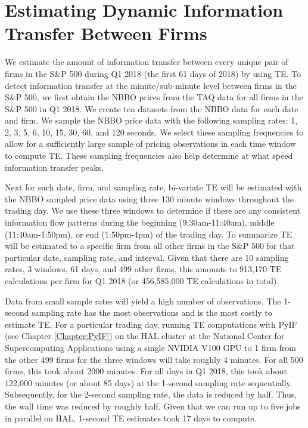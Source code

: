 \section{Estimating Dynamic Information Transfer Between Firms}

We estimate the amount of information transfer between every unique pair of firms in the S\&P 500 during Q1 2018 (the first 61 days of 2018) by using TE.  To detect information transfer at the minute/sub-minute level between firms in the S\&P 500, we first obtain the NBBO prices from the TAQ data for all firms in the S\&P 500 in Q1 2018.  We create ten datasets from the NBBO data for each date and firm.  We sample the NBBO price data with the following sampling rates: 1,  2,  3,  5,  6,  10,  15,  30,  60,  and 120 seconds. We select these sampling frequencies to allow for a sufficiently large sample of pricing observations in each time window to compute TE.  These sampling frequencies also help determine at what speed information transfer peaks.  

Next for each date,  firm, and sampling rate,  bi-variate TE will be estimated with the NBBO sampled price data using three 130 minute windows throughout the trading day. We use these three windows to determine if there are any consistent information flow patterns during the beginning (9:30am-11:40am), middle (11:40am-1:50pm), or end (1:50pm-4pm) of the trading day.  To summarize TE will be estimated to a specific firm from all other firms in the S\&P 500 for that particular date,  sampling rate,  and interval.  Given that there are 10 sampling rates,  3 windows,  61 days,  and 499 other firms, this amounts to 913,170 TE calculations per firm for Q1 2018 (or 456,585,000 TE calculations in total).  

Data from small sample rates will yield a high number of observations.  %
The 1-second sampling rate has the most observations and is the most costly to estimate TE.  For a particular trading day,   running TE computations with PyIF (see Chapter \ref{Chapter:PyIF}) on the HAL cluster at the National Center for Supercomputing Applications using a single NVIDIA V100 GPU to 1 firm from the other 499 firms for the three windows will take roughly 4 minutes.  For all 500 firms, this took about 2000 minutes.  For all days in Q1 2018, this took about 122,000 minutes (or about 85 days) at the 1-second sampling rate sequentially.  Subsequently, for the 2-second sampling rate, the data is reduced by half. Thus, the wall time was reduced by roughly half.   Given that we can run up to five jobs in parallel on HAL, 1-second TE estimates took 17 days to compute. 

